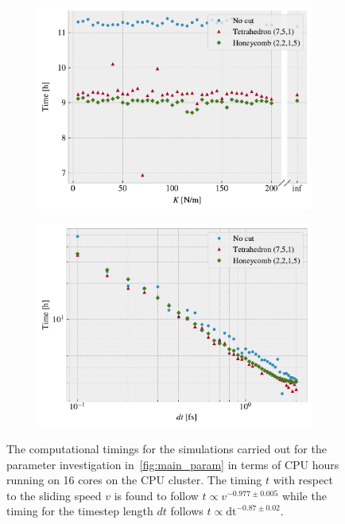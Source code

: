 \begin{figure}[!htb]
\begin{subfigure}[t]{0.49\textwidth}
      \includegraphics[width=\textwidth]{figures/baseline/comp_cost_K.pdf}
      \caption{}
      \label{fig:comp_K}
    \end{subfigure}
    \hfill
    \begin{subfigure}[t]{0.49\textwidth}
        \centering
        \includegraphics[width=\textwidth]{figures/baseline/comp_cost_dt.pdf}
        \caption{}
        \label{fig:comp_dt}
    \end{subfigure}
    \hfill
    \caption{The computational timings for the simulations carried out for the parameter investigation in~\cref{fig:main_param} in terms of CPU hours running on 16 cores on the CPU cluster. The timing $t$ with respect to the sliding speed $v$ is found to follow $t \propto
    v^{-0.977 \pm 0.005}$ while the timing for the timestep length $dt$ follows $t \propto \text{dt}^{-0.87\pm 0.02}$.}
    \label{fig:comp_cost}
\end{figure}

